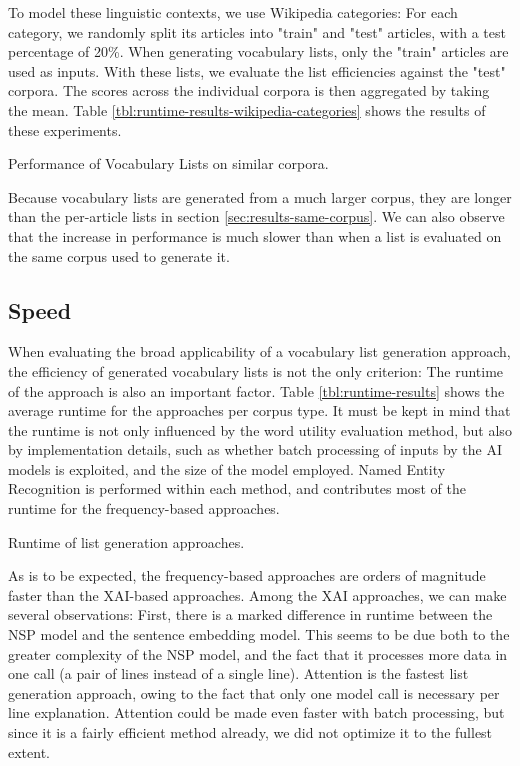 To model these linguistic contexts, we use Wikipedia categories:
For each category, we randomly split its articles into "train" and "test" articles, with a test percentage of 20\%.
When generating vocabulary lists, only the "train" articles are used as inputs.
With these lists, we evaluate the list efficiencies against the "test" corpora.
The scores across the individual corpora is then aggregated by taking the mean.
Table \ref{tbl:runtime-results-wikipedia-categories} shows the results of these experiments.

\begin{table}[ht]
	\centering
	
	\caption{Performance of Vocabulary Lists on similar corpora.}
	\label{tbl:runtime-results-wikipedia-categories}
\end{table}

Because vocabulary lists are generated from a much larger corpus, they are longer than the per-article lists in section \ref{sec:results-same-corpus}.
We can also observe that the increase in performance is much slower than when a list is evaluated on the same corpus used to generate it.



\subsection{Speed}
When evaluating the broad applicability of a vocabulary list generation approach, the efficiency of generated vocabulary lists is not the only criterion:
The runtime of the approach is also an important factor.
Table \ref{tbl:runtime-results} shows the average runtime for the approaches per corpus type.
It must be kept in mind that the runtime is not only influenced by the word utility evaluation method, but also by implementation details, such as whether batch processing of inputs by the AI models is exploited, and the size of the model employed.
Named Entity Recognition is performed within each method, and contributes most of the runtime for the frequency-based approaches.

\begin{table}[ht]
	\centering
	
	\caption{Runtime of list generation approaches.}
	\label{tbl:runtime-results}
\end{table}

As is to be expected, the frequency-based approaches are orders of magnitude faster than the XAI-based approaches.
Among the XAI approaches, we can make several observations:
First, there is a marked difference in runtime between the NSP model and the sentence embedding model.
This seems to be due both to the greater complexity of the NSP model, and the fact that it processes more data in one call (a pair of lines instead of a single line).
Attention is the fastest list generation approach, owing to the fact that only one model call is necessary per line explanation.
Attention could be made even faster with batch processing, but since it is a fairly efficient method already, we did not optimize it to the fullest extent.

